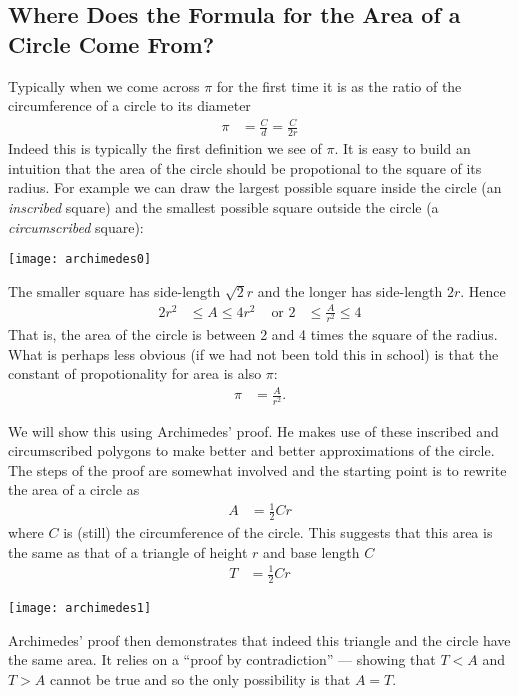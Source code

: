 \subsection{Where Does the Formula for the Area of a Circle Come From?}
\label{ssec_B_5_1}
Typically when we come across $\pi$ for the first time it is as the ratio of the
circumference of a circle to its diameter
\begin{align*}
  \pi &= \frac{C}{d} = \frac{C}{2r}
\end{align*}
Indeed this is typically the first definition we see of $\pi$.  It is easy to build an intuition that the area of the circle should be propotional to the square of its radius. For example we can draw the largest possible square inside the circle (an \emph{inscribed} square) and the smallest possible square outside the circle (a \emph{circumscribed} square):
\begin{center}
 \texttt{[image: archimedes0]}
\end{center}
The smaller square has side-length $\sqrt{2} r$ and the longer has side-length $2r$. Hence
\begin{align*}
  2 r^2 & \leq A \leq 4r^2 & \text{ or }  2 & \leq \frac{A}{r^2} \leq 4
\end{align*}
That is, the area of the circle is between 2 and 4 times the square of the radius. What is perhaps less obvious (if we had not been told this in school) is that the constant of propotionality for area is also $\pi$:
\begin{align*}
  \pi &= \frac{A}{r^2}.
\end{align*}


We will show this using Archimedes' proof. He makes use of these inscribed and circumscribed polygons to make better and better approximations of the circle. The steps of the proof are somewhat involved and the starting point is to rewrite the area of a circle as
\begin{align*}
  A &= \frac{1}{2} C r
\end{align*}
where $C$ is (still) the circumference of the circle. This suggests that this
area is the same as that of a triangle of height $r$ and base
length $C$
\begin{align*}
  T &= \frac{1}{2} C r
\end{align*}
\begin{center}
 \texttt{[image: archimedes1]}
\end{center}
Archimedes' proof then demonstrates that indeed this triangle and the circle have the same
area. It relies on a ``proof by contradiction'' --- showing that $T<A$ and $T>A$ cannot
be true and so the only possibility is that $A=T$.

